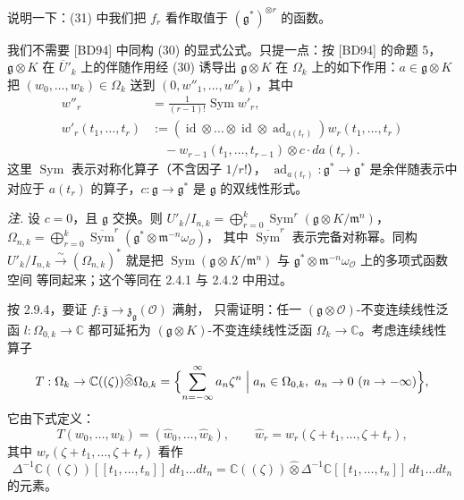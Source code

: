 
说明一下：(31) 中我们把 $f_r$ 看作取值于 $(\mathfrak{g}^*)^{\otimes r}$ 的函数。

我们不需要 [BD94] 中同构 (30) 的显式公式。只提一点：按 [BD94] 的命题 5，
$\mathfrak{g}\otimes K$ 在 $\overline{U}'_k$ 上的伴随作用经 (30) 诱导出
$\mathfrak{g}\otimes K$ 在 $\Omega_k$ 上的如下作用：$a\in\mathfrak{g}\otimes K$
把 $(w_0,\ldots,w_k)\in\Omega_k$ 送到 $(0,w''_1,\ldots,w''_k)$，其中
\[
\begin{aligned}
w''_r&=\frac{1}{(r-1)!}\operatorname{Sym} w'_r,\\
w'_r(t_1,\ldots,t_r)&:=(\operatorname{id}\otimes\ldots\otimes\operatorname{id}
  \otimes\operatorname{ad}_{a(t_r)})w_r(t_1,\ldots,t_r)\\
&\quad-w_{r-1}(t_1,\ldots,t_{r-1})\otimes c\cdot da(t_r).
\end{aligned}
\]
这里 $\operatorname{Sym}$ 表示对称化算子（不含因子 $1/r!$），
$\operatorname{ad}_{a(t_r)}:\mathfrak{g}^*\to\mathfrak{g}^*$ 是余伴随表示中
对应于 $a(t_r)$ 的算子，$c:\mathfrak{g}\to\mathfrak{g}^*$ 是 $\mathfrak{g}$
的双线性形式。

\emph{注.} 设 $c=0$，且 $\mathfrak{g}$ 交换。则
$U'_k/I_{n,k}=\bigoplus_{r=0}^k\operatorname{Sym}^r(\mathfrak{g}\otimes K/\mathfrak{m}^n)$，
$\Omega_{n,k}=\bigoplus_{r=0}^k\overline{\operatorname{Sym}}^r
(\mathfrak{g}^*\otimes\mathfrak{m}^{-n}\omega_{\mathcal{O}})$，
其中 $\overline{\operatorname{Sym}}^r$ 表示完备对称幂。同构
$U'_k/I_{n,k}\xrightarrow{\sim}(\Omega_{n,k})^*$ 就是把
$\operatorname{Sym}(\mathfrak{g}\otimes K/\mathfrak{m}^n)$ 与
$\mathfrak{g}^*\otimes\mathfrak{m}^{-n}\omega_{\mathcal{O}}$ 上的多项式函数空间
等同起来；这个等同在 2.4.1 与 2.4.2 中用过。

 按 2.9.4，要证
$f:\bar{\mathfrak{z}}\to\mathfrak{z}_{\mathfrak{g}}(\mathcal{O})$ 满射，
只需证明：任一 $(\mathfrak{g}\otimes\mathcal{O})$-不变连续线性泛函
$l:\Omega_{0,k}\to\mathbb{C}$ 都可延拓为 $(\mathfrak{g}\otimes K)$-不变连续线性泛函
$\Omega_k\to\mathbb{C}$。考虑连续线性算子
\[
T:\Omega_k\to\mathbb{C}((\zeta))\widehat{\otimes}\Omega_{0,k}
=\Bigl\{\sum_{n=-\infty}^{\infty}a_n\zeta^n
\Bigm| a_n\in\Omega_{0,k},\ a_n\to 0\ (n\to-\infty)\Bigr\},
\]
它由下式定义：
\begin{equation}\tag{32}
T(w_0,\ldots,w_k)=(\widehat{w}_0,\ldots,\widehat{w}_k),\qquad
\widehat{w}_r=w_r(\zeta+t_1,\ldots,\zeta+t_r),
\end{equation}
其中 $w_r(\zeta+t_1,\ldots,\zeta+t_r)$ 看作
\[
\Delta^{-1}\mathbb{C}((\zeta))[[t_1,\ldots,t_n]]\,dt_1\ldots dt_n
=\mathbb{C}((\zeta))\widehat{\otimes}\Delta^{-1}\mathbb{C}[[t_1,\ldots,t_n]]
\,dt_1\ldots dt_n
\]
的元素。

